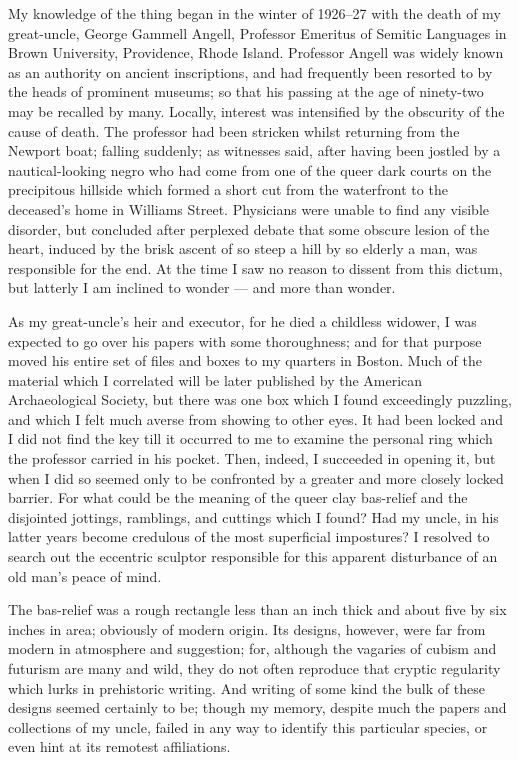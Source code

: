 \begin{pages}
\begin{Leftside}
My knowledge of the thing began in the winter of 1926--27 with the death
of my great-uncle, George Gammell Angell, Professor Emeritus of Semitic
Languages in Brown University, Providence, Rhode Island. Professor
Angell was widely known as an authority on ancient inscriptions, and had
frequently been resorted to by the heads of prominent museums; so that
his passing at the age of ninety-two may be recalled by many. Locally,
interest was intensified by the obscurity of the cause of death. The
professor had been stricken whilst returning from the Newport boat;
falling suddenly; as witnesses said, after having been jostled by a
nautical-looking negro who had come from one of the queer dark courts on
the precipitous hillside which formed a short cut from the waterfront to
the deceased's home in Williams Street. Physicians were unable to find
any visible disorder, but concluded after perplexed debate that some
obscure lesion of the heart, induced by the brisk ascent of so steep a
hill by so elderly a man, was responsible for the end. At the time I saw
no reason to dissent from this dictum, but latterly I am inclined to
wonder --- and more than wonder.

As my great-uncle's heir and executor, for he died a childless widower,
I was expected to go over his papers with some thoroughness; and for
that purpose moved his entire set of files and boxes to my quarters in
Boston. Much of the material which I correlated will be later published
by the American Archaeological Society, but there was one box which I
found exceedingly puzzling, and which I felt much averse from showing to
other eyes. It had been locked and I did not find the key till it
occurred to me to examine the personal ring which the professor carried
in his pocket. Then, indeed, I succeeded in opening it, but when I did
so seemed only to be confronted by a greater and more closely locked
barrier. For what could be the meaning of the queer clay bas-relief and
the disjointed jottings, ramblings, and cuttings which I found? Had my
uncle, in his latter years become credulous of the most superficial
impostures? I resolved to search out the eccentric sculptor responsible
for this apparent disturbance of an old man's peace of mind.

The bas-relief was a rough rectangle less than an inch thick and about
five by six inches in area; obviously of modern origin. Its designs,
however, were far from modern in atmosphere and suggestion; for,
although the vagaries of cubism and futurism are many and wild, they do
not often reproduce that cryptic regularity which lurks
in prehistoric
writing. And writing of some kind the bulk of these designs seemed
certainly to be; though my memory, despite much the papers and
collections of my uncle, failed in any way to identify this particular
species, or even hint at its remotest affiliations.


\end{Leftside}
\end{pages}
